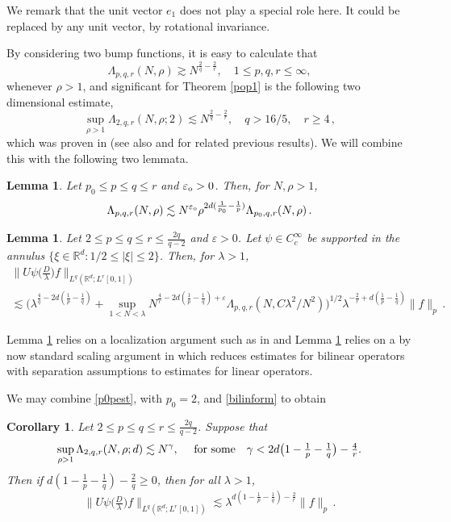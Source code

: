 \documentclass[11pt]{amsart}
\newtheorem{corollary}[theorem]{Corollary}
\newtheorem{lemma}[theorem]{Lemma}
\theoremstyle{definition}
\numberwithin{theorem}{section}
\numberwithin{definition}{section}
\numberwithin{equation}{section}
\newcommand{\Be}{\begin{equation}}
\newcommand{\Ee}{\end{equation}}
\renewcommand{\le}{\leqslant}
\renewcommand{\ge}{\geqslant}
\def\lc{\lesssim}
\def\gc{\gtrsim}
\def\eps{\varepsilon}
\def\la{\lambda}             \def\La{\Lambda}
\def\bbR{{\mathbb {R}}}
\renewcommand{\le}{\leqslant}
\renewcommand{\ge}{\geqslant}
\begin{document}
We remark that the unit vector $e_1$ does not play a special role here. It could be replaced by any unit vector, by rotational invariance.





By considering two bump functions, it is easy to calculate that
\Be\label{lowertriv}
\Lambda_{p,q,r}(N,\rho) \gc
 N^{\frac 2q-\frac 2r},\quad 1\le p,q,r\le \infty,
\Ee
whenever $\rho>1$,
and significant for Theorem \ref{pop1} is  the  following two dimensional estimate,
\Be\label{lrv-result}
\sup_{\rho>1}\Lambda_{2,q,r}(N,\rho;2) \lc
 N^{\frac 2q-\frac 2r}, \quad q>16/5, \quad r\ge 4\,,
\Ee
which was proven in \cite{lerova}
(see also \cite{le1} and \cite{ro} for related previous results).
We will combine this with the following two lemmata.
\begin{lemma}\label{2sthenps}
Let $p_0\le p\le q\le r$ and $\eps_{\rm{o}}>0$. Then, for $N,\rho>1$, \Be\label{p0pest}
\Lambda_{p,q,r}(N,\rho) \lc N^{\eps_{\rm{o}}}
\rho^{2d(\frac{1}{p_0}-\frac
1p)} \Lambda_{p_0,q,r}(N,\rho)\,.
\Ee
\end{lemma}


\begin{lemma}\label{billemma}
Let $2\le p\le  q\le r\le \frac{2q}{q-2}$ and $\eps>0$.
Let $\psi\in C_c^\infty$ be supported in the annulus
$\{\xi\in \bbR^d: 1/2\le |\xi|\le 2\}$. Then, for  $\la> 1$,
\begin{multline}\label{bilinform}
\big\|U\psi\big(\tfrac D\la\big) f\big\|_{L^q(\bbR^d;L^r[0,1])}
\\
\lc \Big(\la^{\frac{4}{q}-2d(\frac1p-\frac1q)}+\sup_{1< N< \la}
N^{\frac4r-2d(\frac1p-\frac1q)+\eps} \Lambda_{p,q,r}(N,C
\la^2/N^2)\Big)^{1/2} \la^{-\frac 2r+d(\frac 1p-\frac 1q)}
\|f\|_p\,.
\end{multline}
\end{lemma}

Lemma \ref{2sthenps} relies on a localization argument such as in
\cite{le}
and Lemma \ref{billemma} relies on a by now standard scaling argument in
\cite{tavave} which reduces estimates for bilinear  operators with separation assumptions to estimates for linear operators.



We may combine  \eqref{p0pest},  with $p_0=2$, and
\eqref{bilinform} to obtain
\begin{corollary}\label{2qrcor}
Let  $2\le p\le q\le r\le \frac{2q}{q-2}$.  Suppose that \Be\label{2qrassumption}
\sup_{\rho> 1} \Lambda_{2,q,r}(N,\rho;d)\lc N^{\gamma},\quad \text{
for some\quad $\gamma<2d\big(1-\tfrac 1p-\tfrac 1q\big)-\tfrac 4r$} .\Ee Then if
$d(1-\frac1p-\frac1q)-\frac2q\ge 0$, then for all $\la>1$,
\Be\label{dyadfreqconclusion} \big\|
U\psi\big(\tfrac D\la\big)f\big\|_{L^q(\bbR^d;L^r[0,1])} \lc \la^{d(1-\frac 1p-\frac 1q)-\frac
2r} \|f\|_p\,. \Ee
\end{corollary}
\end{document}
